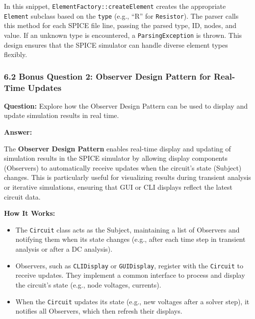 \documentclass{article}
\begin{document}
\begin{itemize}
In this snippet, \texttt{ElementFactory::createElement} creates the appropriate \texttt{Element} subclass based on the \texttt{type} (e.g., “R” for \texttt{Resistor}). The parser calls this method for each SPICE file line, passing the parsed type, ID, nodes, and value. If an unknown type is encountered, a \texttt{ParsingException} is thrown. This design ensures that the SPICE simulator can handle diverse element types flexibly.

\subsubsection*{6.2 Bonus Question 2: Observer Design Pattern for Real-Time Updates}

\textbf{Question:} Explore how the Observer Design Pattern can be used to display and update simulation results in real time.

\textbf{Answer:}

The \textbf{Observer Design Pattern} enables real-time display and updating of simulation results in the SPICE simulator by allowing display components (Observers) to automatically receive updates when the circuit’s state (Subject) changes. This is particularly useful for visualizing results during transient analysis or iterative simulations, ensuring that GUI or CLI displays reflect the latest circuit data.

\textbf{How It Works:}
\begin{itemize}
    \item The \texttt{Circuit} class acts as the Subject, maintaining a list of Observers and notifying them when its state changes (e.g., after each time step in transient analysis or after a DC analysis).
    \item Observers, such as \texttt{CLIDisplay} or \texttt{GUIDisplay}, register with the \texttt{Circuit} to receive updates. They implement a common interface to process and display the circuit’s state (e.g., node voltages, currents).
    \item When the \texttt{Circuit} updates its state (e.g., new voltages after a solver step), it notifies all Observers, which then refresh their displays.
\end{itemize}


\end{itemize}
\end{document}
